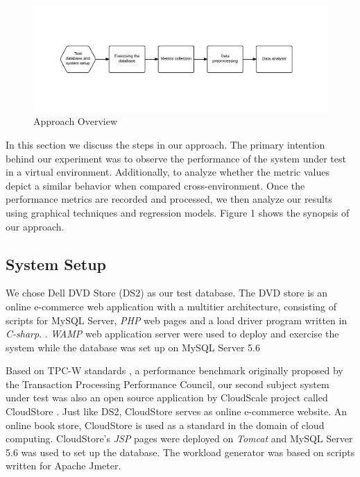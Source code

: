 
\begin{figure}[!t]
	\centering
	\includegraphics[width=\textwidth]{figures/approach.pdf}
	\caption{Approach Overview}
	\captionsetup{justification=centering}
	\label{fig:Approach}
	
\end{figure}

In this section we discuss the steps in our approach. The primary intention behind our experiment was to observe the performance of the system under test in a virtual environment. Additionally, to analyze whether the metric values depict a similar behavior when compared cross-environment. Once the performance metrics are recorded and processed, we then analyze our results using graphical techniques and regression models. Figure 1 shows the synopsis of our approach.


\subsection{System Setup}
We chose Dell DVD Store (DS2) \cite{delldvd} as our test database. The DVD store is an online e-commerce web application with a multitier architecture, consisting of scripts for MySQL Server, \textit{PHP} web pages and a load driver program written in \textit{C-sharp}. \cite{Shang:2015:ADP:2668930.2688052} \cite{Nguyen:2012:ADP:2188286.2188344} \cite{Nguyen:2012:ADP:2188286.2188344}. \textit{WAMP} \cite{wamp} web application server were used to deploy and exercise the system while the database was set up on MySQL Server 5.6 \cite{mysql}

Based on TPC-W standards \cite{tpcw}, a performance benchmark originally proposed by the Transaction Processing Performance Council, our second subject system under test was also an open source application by CloudScale project \cite{cloudscaleproject} called CloudStore \cite{cloudstore}. Just like DS2, CloudStore serves as online e-commerce website. An online book store, CloudStore is used as a standard in the domain of cloud computing. CloudStore's \textit{JSP} pages were deployed on \textit{Tomcat} \cite{tomcat} and MySQL Server 5.6 \cite{mysql} was used to set up the database. The workload generator was based on scripts written for Apache Jmeter. \cite{apachejmeter}

